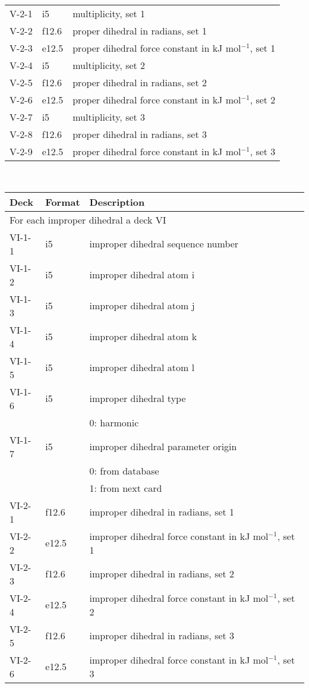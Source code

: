 \begin{center}
\begin{tabular*}{150mm}{p{12mm}p{12mm}l}
V-2-1 & i5     & multiplicity, set 1\\
V-2-2 & f12.6  & proper dihedral in radians, set 1\\
V-2-3 & e12.5  & proper dihedral force constant in kJ mol$^{-1}$, set 1 \\
V-2-4 & i5     & multiplicity, set 2\\
V-2-5 & f12.6  & proper dihedral in radians, set 2\\
V-2-6 & e12.5  & proper dihedral force constant in kJ mol$^{-1}$, set 2 \\
V-2-7 & i5     & multiplicity, set 3\\
V-2-8 & f12.6  & proper dihedral in radians, set 3\\
V-2-9 & e12.5  & proper dihedral force constant in kJ mol$^{-1}$, set 3 \\
\hline
\end{tabular*}\\
\begin{tabular*}{150mm}{p{12mm}p{12mm}l}
\hline\hline
Deck & Format & Description \\ \hline
\multicolumn{3}{l}{For each improper dihedral a deck VI} \\
VI-1-1 & i5     & improper dihedral sequence number \\
VI-1-2 & i5     & improper dihedral atom i \\
VI-1-3 & i5     & improper dihedral atom j \\
VI-1-4 & i5     & improper dihedral atom k \\
VI-1-5 & i5     & improper dihedral atom l \\
VI-1-6 & i5     & improper dihedral type \\
       &        & 0: harmonic\\
VI-1-7 & i5     & improper dihedral parameter origin\\
       &        & 0: from database \\
       &        & 1: from next card\\
VI-2-1 & f12.6  & improper dihedral in radians, set 1\\
VI-2-2 & e12.5  & improper dihedral force constant in kJ mol$^{-1}$, set 1 \\
VI-2-3 & f12.6  & improper dihedral in radians, set 2\\
VI-2-4 & e12.5  & improper dihedral force constant in kJ mol$^{-1}$, set 2 \\
VI-2-5 & f12.6  & improper dihedral in radians, set 3\\
VI-2-6 & e12.5  & improper dihedral force constant in kJ mol$^{-1}$, set 3 \\
\hline\hline
\end{tabular*}
\end{center}
